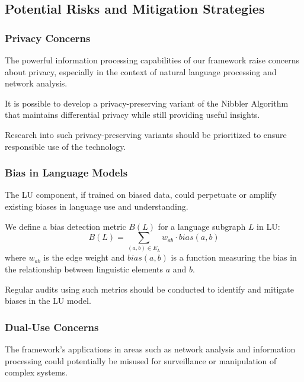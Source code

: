 \subsection{Potential Risks and Mitigation Strategies}

\subsubsection{Privacy Concerns}

The powerful information processing capabilities of our framework raise concerns about privacy, especially in the context of natural language processing and network analysis.

\begin{proposition}
It is possible to develop a privacy-preserving variant of the Nibbler Algorithm that maintains differential privacy while still providing useful insights.
\end{proposition}

Research into such privacy-preserving variants should be prioritized to ensure responsible use of the technology.

\subsubsection{Bias in Language Models}

The LU component, if trained on biased data, could perpetuate or amplify existing biases in language use and understanding.

\begin{definition}
We define a bias detection metric $B(L)$ for a language subgraph $L$ in LU:
\begin{equation}
    B(L) = \sum_{(a,b) \in E_L} w_{ab} \cdot bias(a,b)
\end{equation}
where $w_{ab}$ is the edge weight and $bias(a,b)$ is a function measuring the bias in the relationship between linguistic elements $a$ and $b$.
\end{definition}

Regular audits using such metrics should be conducted to identify and mitigate biases in the LU model.

\subsubsection{Dual-Use Concerns}

The framework's applications in areas such as network analysis and information processing could potentially be misused for surveillance or manipulation of complex systems.

